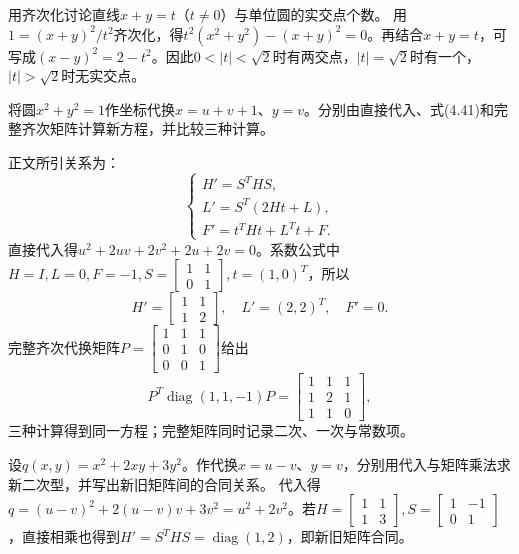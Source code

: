 用齐次化讨论直线\(x+y=t\)（\(t\ne0\)）与单位圆的实交点个数。
\solutionanswer
用\(1=(x+y)^2/t^2\)齐次化，得\(t^2(x^2+y^2)-(x+y)^2=0\)。再结合\(x+y=t\)，可写成\((x-y)^2=2-t^2\)。因此\(0<|t|<\sqrt2\)时有两交点，\(|t|=\sqrt2\)时有一个，\(|t|>\sqrt2\)时无实交点。


将圆\(x^2+y^2=1\)作坐标代换\(x=u+v+1\)、\(y=v\)。分别由直接代入、式\textup{(4.41)}和完整齐次矩阵计算新方程，并比较三种计算。

\par\smallskip\noindent 正文所引关系为：
\begin{equation*}
\begin{cases}
        H'=S^THS ,\\
        L'=S^T(2Ht+L) ,\\
        F'=t^THt+L^Tt+F .
    \end{cases}
\end{equation*}
\solutionanswer
直接代入得\(u^2+2uv+2v^2+2u+2v=0\)。系数公式中\(H=I,L=0,F=-1,S=\begin{bmatrix}1&1\\0&1\end{bmatrix},t=(1,0)^T\)，所以
\[
H'=\begin{bmatrix}1&1\\1&2\end{bmatrix},\quad L'=(2,2)^T,\quad F'=0.
\]
完整齐次代换矩阵\(P=\begin{bmatrix}1&1&1\\0&1&0\\0&0&1\end{bmatrix}\)给出
\[
P^T\operatorname{diag}(1,1,-1)P=\begin{bmatrix}1&1&1\\1&2&1\\1&1&0\end{bmatrix},
\]
三种计算得到同一方程；完整矩阵同时记录二次、一次与常数项。


设\(q(x,y)=x^2+2xy+3y^2\)。作代换\(x=u-v\)、\(y=v\)，分别用代入与矩阵乘法求新二次型，并写出新旧矩阵间的合同关系。
\solutionanswer
代入得\(q=(u-v)^2+2(u-v)v+3v^2=u^2+2v^2\)。若\(H=\begin{bmatrix}1&1\\1&3\end{bmatrix},S=\begin{bmatrix}1&-1\\0&1\end{bmatrix}\)，直接相乘也得到\(H'=S^THS=\operatorname{diag}(1,2)\)，即新旧矩阵合同。


